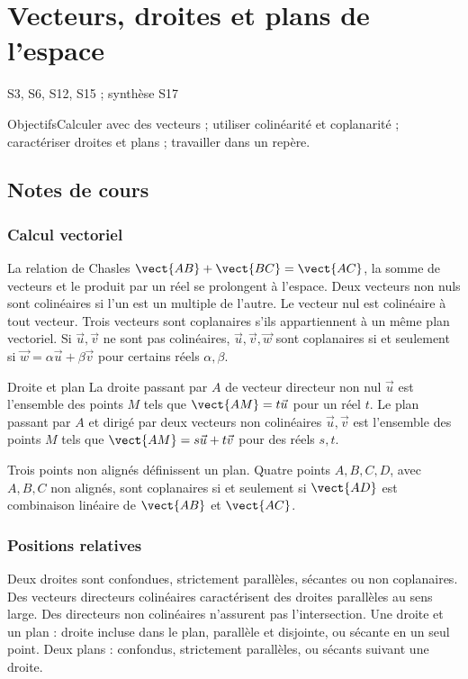\setcounter{chapter}{9}\chapter{Vecteurs, droites et plans de l'espace}\label{ch:10}

{\small\sffamily\color{teal}S3, S6, S12, S15 ; synthèse S17\par}

\begin{retenir}{Objectifs}Calculer avec des vecteurs ; utiliser colinéarité et coplanarité ; caractériser droites et plans ; travailler dans un repère.\end{retenir}

\section{Notes de cours}
\subsection{Calcul vectoriel}
La relation de Chasles $\vect{AB}+\vect{BC}=\vect{AC}$, la somme de vecteurs et le produit par un réel se prolongent à l'espace. Deux vecteurs non nuls sont colinéaires si l'un est un multiple de l'autre. Le vecteur nul est colinéaire à tout vecteur.
Trois vecteurs sont coplanaires s'ils appartiennent à un même plan vectoriel. Si $\vec u,\vec v$ ne sont pas colinéaires, $\vec u,\vec v,\vec w$ sont coplanaires si et seulement si $\vec w=\alpha\vec u+\beta\vec v$ pour certains réels $\alpha,\beta$.
\begin{retenir}{Droite et plan}
La droite passant par $A$ de vecteur directeur non nul $\vec u$ est l'ensemble des points $M$ tels que $\vect{AM}=t\vec u$ pour un réel $t$.
Le plan passant par $A$ et dirigé par deux vecteurs non colinéaires $\vec u,\vec v$ est l'ensemble des points $M$ tels que $\vect{AM}=s\vec u+t\vec v$ pour des réels $s,t$.
\end{retenir}
Trois points non alignés définissent un plan. Quatre points $A,B,C,D$, avec $A,B,C$ non alignés, sont coplanaires si et seulement si $\vect{AD}$ est combinaison linéaire de $\vect{AB}$ et $\vect{AC}$.
\subsection{Positions relatives}
Deux droites sont confondues, strictement parallèles, sécantes ou non coplanaires. Des vecteurs directeurs colinéaires caractérisent des droites parallèles au sens large. Des directeurs non colinéaires n'assurent pas l'intersection.
Une droite et un plan : droite incluse dans le plan, parallèle et disjointe, ou sécante en un seul point. Deux plans : confondus, strictement parallèles, ou sécants suivant une droite.
